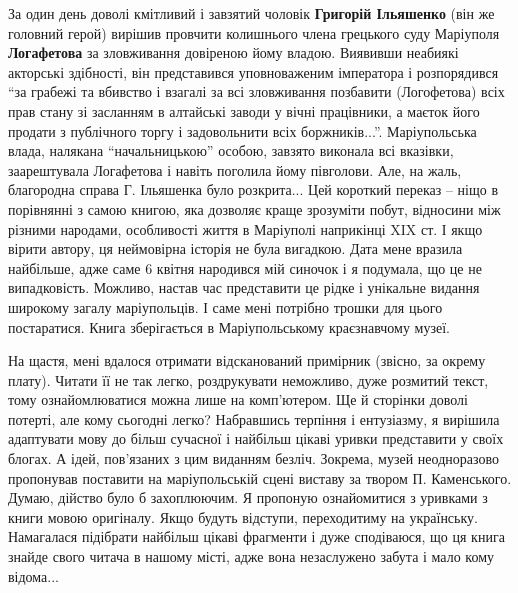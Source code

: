 
За один день доволі кмітливий і завзятий чоловік \textbf{Григорій Ільяшенко} (він же
головний герой) вирішив провчити колишнього члена грецького суду Маріуполя
\textbf{Логафетова} за зловживання довіреною йому владою. Виявивши неабиякі акторські
здібності, він представився уповноваженим імператора і розпорядився \enquote{за грабежі
та вбивство і взагалі за всі зловживання позбавити (Логофетова) всіх прав стану
зі засланням в алтайські заводи у вічні працівники, а маєток його продати з
публічного торгу і задовольнити всіх боржників...}. Маріупольська влада,
налякана \enquote{начальницькою} особою, завзято виконала всі вказівки, заарештувала
Логафетова і навіть поголила йому півголови. Але, на жаль, благородна справа Г.
Ільяшенка було розкрита... Цей короткий переказ – ніщо в порівнянні з самою
книгою, яка дозволяє краще зрозуміти побут, відносини між різними народами,
особливості життя в Маріуполі наприкінці XIX ст. І якщо вірити автору, ця
неймовірна історія не була вигадкою. Дата мене вразила найбільше, адже саме 6
квітня народився мій синочок і я подумала, що це не випадковість. Можливо,
настав час представити це рідке і унікальне видання широкому загалу
маріупольців. І саме мені потрібно трошки для цього постаратися. Книга
зберігається в Маріупольському краєзнавчому музеї.

На щастя, мені вдалося отримати відсканований примірник (звісно, за окрему
плату). Читати її не так легко, роздрукувати неможливо, дуже розмитий текст,
тому ознайомлюватися можна лише на комп'ютером. Ще й сторінки доволі потерті,
але кому сьогодні легко? Набравшись терпіння і ентузіазму, я вирішила
адаптувати мову до більш сучасної і найбільш цікаві уривки представити у своїх
блогах. А ідей, пов'язаних з цим виданням безліч. Зокрема, музей неодноразово
пропонував поставити на маріупольській сцені виставу за твором П. Каменського.
Думаю, дійство було б захоплюючим. Я пропоную ознайомитися з уривками з книги
мовою оригіналу. Якщо будуть відступи, переходитиму на українську. Намагалася
підібрати найбільш цікаві фрагменти і дуже сподіваюся, що ця книга знайде свого
читача в нашому місті, адже вона незаслужено забута і мало кому відома...


